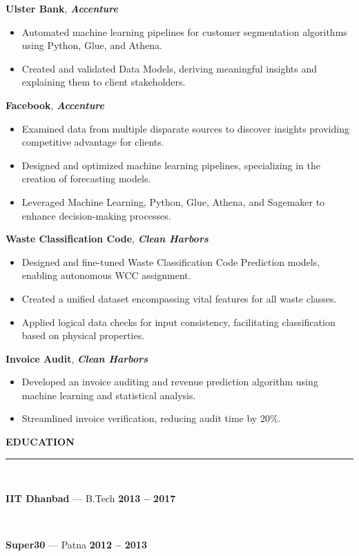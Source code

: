 \documentclass[a4paper,9pt]{article}
\newcommand{\cvsection}[2]{%
  \vspace{4pt}
  {\color{primary}\faIcon{#1}\hspace{6pt}\textbf{\fontsize{10pt}{12pt}\selectfont\uppercase{#2}}}\\[-2pt]
  \color{primary}\rule{\linewidth}{0.8pt}\\[-2pt]
  \color{textcolor}
}
\newcommand{\projectentry}[2]{%
  \vspace{2pt}
  \parbox[t]{\linewidth}{\textbf{\textcolor{primary}{#1}}, \textit{\textcolor{primary}{\textbf{#2}}}}
}
\newcommand{\educationentry}[3]{%
  \vspace{2pt}
  \parbox[t]{\linewidth}{\textbf{#1} --- #2 \hfill \textbf{\textcolor{primary}{#3}}}\\[-1pt]
}
\begin{document}
\begin{paracol}{2}
  \projectentry{Ulster Bank}{\textbf{Accenture}}
  \begin{itemize}
    \item Automated machine learning pipelines for customer segmentation algorithms using Python, Glue, and Athena.
    \item Created and validated Data Models, deriving meaningful insights and explaining them to client stakeholders.
  \end{itemize}

  \projectentry{Facebook}{\textbf{Accenture}}
  \begin{itemize}
    \item Examined data from multiple disparate sources to discover insights providing competitive advantage for clients.
    \item Designed and optimized machine learning pipelines, specializing in the creation of forecasting models.
    \item Leveraged Machine Learning, Python, Glue, Athena, and Sagemaker to enhance decision-making processes.
  \end{itemize}

  \projectentry{Waste Classification Code}{\textbf{Clean Harbors}}
  \begin{itemize}
    \item Designed and fine-tuned Waste Classification Code Prediction models, enabling autonomous WCC assignment.
    \item Created a unified dataset encompassing vital features for all waste classes.
    \item Applied logical data checks for input consistency, facilitating classification based on physical properties.
  \end{itemize}

  \projectentry{Invoice Audit}{\textbf{Clean Harbors}}
  \begin{itemize}
    \item Developed an invoice auditing and revenue prediction algorithm using machine learning and statistical analysis.
    \item Streamlined invoice verification, reducing audit time by 20\%.
  \end{itemize}

  \switchcolumn

  \cvsection{graduation-cap}{Education}
  \small
  \educationentry{IIT Dhanbad}{B.Tech}{2013 -- 2017}
  \educationentry{Super30}{Patna}{2012 -- 2013}


\end{paracol}
\end{document}
